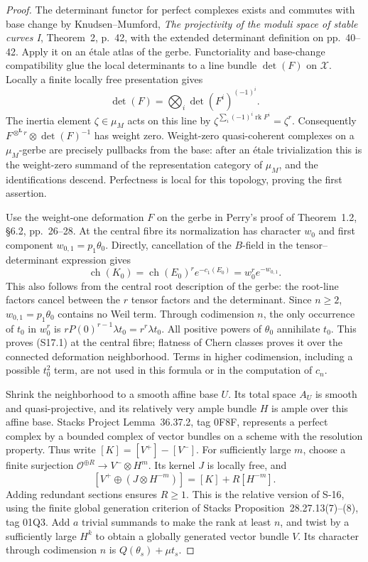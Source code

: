 \begin{proof}
The determinant functor for perfect complexes exists and commutes
with base change by Knudsen--Mumford, \emph{The projectivity of the
moduli space of stable curves I}, Theorem~2, p.~42, with the
extended determinant definition on pp.~40--42. Apply it on an
\'etale atlas of the gerbe. Functoriality and base-change
compatibility glue the local determinants to a line bundle
$\det(F)$ on $\mathcal X$. Locally a finite locally free
presentation gives
\[
 \det(F)=\bigotimes_i\det(F^i)^{(-1)^i}.
\]
The inertia element $\zeta\in\mu_M$ acts on this line by
$\zeta^{\sum_i(-1)^i\operatorname{rk}F^i}=\zeta^r$.
Consequently $F^{\otimes^{\mathbf L}r}\otimes\det(F)^{-1}$
has weight zero. Weight-zero quasi-coherent complexes on a
$\mu_M$-gerbe are precisely pullbacks from the base: after an
\'etale trivialization this is the weight-zero summand of the
representation category of $\mu_M$, and the identifications
descend. Perfectness is local for this topology, proving the
first assertion.

Use the weight-one deformation $F$ on the gerbe in Perry's proof
of Theorem~1.2, \S6.2, pp.~26--28. At the central fibre its
normalization has character $w_0$ and first component
$w_{0,1}=p_1\theta_0$. Directly, cancellation of the $B$-field
in the tensor--determinant expression gives
\[
 \operatorname{ch}(K_0)
 =\operatorname{ch}(E_0)^r
       e^{-c_1(E_0)}
 =w_0^r e^{-w_{0,1}} .
\]
This also follows from the central root description of the gerbe:
the root-line factors cancel between the $r$ tensor factors and
the determinant. Since $n\ge2$, $w_{0,1}=p_1\theta_0$ contains
no Weil term. Through codimension $n$, the only occurrence of
$t_0$ in $w_0^r$ is
$rP(0)^{r-1}\lambda t_0=r^r\lambda t_0$.
All positive powers of $\theta_0$ annihilate $t_0$.
This proves (S17.1) at the central fibre; flatness of Chern classes
proves it over the connected deformation neighborhood.
Terms in higher codimension, including a possible $t_0^2$ term,
are not used in this formula or in the computation of $c_n$.

Shrink the neighborhood to a smooth affine base $U$.
Its total space $A_U$ is smooth and quasi-projective, and its
relatively very ample bundle $H$ is ample over this affine base.
Stacks Project Lemma~36.37.2, tag 0F8F, represents a perfect
complex by a bounded complex of vector bundles on a scheme
with the resolution property. Thus write
$[K]=[V^+]-[V^-]$. For sufficiently large $m$, choose a finite
surjection $\mathcal O^{\oplus R}\to V^-\otimes H^m$.
Its kernel $J$ is locally free, and
\[
 [V^+\oplus(J\otimes H^{-m})]=[K]+R[H^{-m}].
\]
Adding redundant sections ensures $R\ge1$.
This is the relative version of S-16, using the finite global
generation criterion of Stacks Proposition~28.27.13(7)--(8),
tag 01Q3. Add $a$ trivial summands to make the rank at least $n$,
and twist by a sufficiently large $H^k$ to obtain a globally
generated vector bundle $V$. Its character through codimension
$n$ is $Q(\theta_s)+\mu t_s$.


\end{proof}
